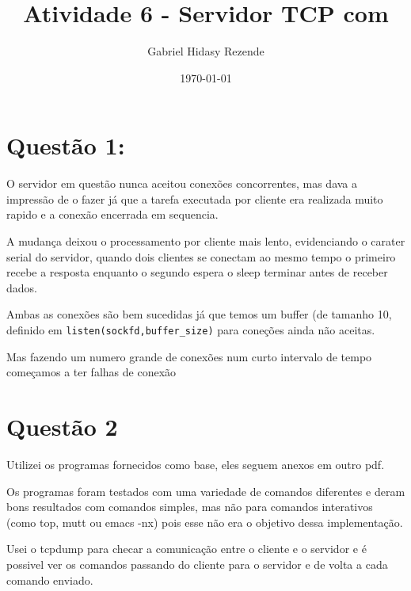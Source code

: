 \documentclass[11pt]{article}
\author{Gabriel Hidasy Rezende}
\date{\today}
\title{Atividade 6 - Servidor TCP com}
\begin{document}
\maketitle


\section{Questão 1:}
\label{sec-1}
O servidor em questão nunca aceitou conexões concorrentes, mas dava a
impressão de o fazer já que a tarefa executada por cliente era
realizada muito rapido e a conexão encerrada em sequencia. 

A mudança deixou o processamento por cliente mais lento, evidenciando
o carater serial do servidor, quando dois clientes se conectam ao
mesmo tempo o primeiro recebe a resposta enquanto o segundo espera o
sleep terminar antes de receber dados.

Ambas as conexões são bem sucedidas já que temos um buffer (de tamanho
10, definido em \texttt{listen(sockfd,buffer\_size)} para coneções ainda não
aceitas.

Mas fazendo um numero grande de conexões num curto intervalo de tempo
começamos a ter falhas de conexão

\section{Questão 2}
\label{sec-2}
Utilizei os programas fornecidos como base, eles seguem anexos em outro pdf.

Os programas foram testados com uma variedade de comandos diferentes e
deram bons resultados com comandos simples, mas não para comandos
interativos (como top, mutt ou emacs -nx) pois esse não era o objetivo
dessa implementação.

Usei o tcpdump para checar a comunicação entre o cliente e o servidor
e é possivel ver os comandos passando do cliente para o servidor e de
volta a cada comando enviado.
\end{document}
